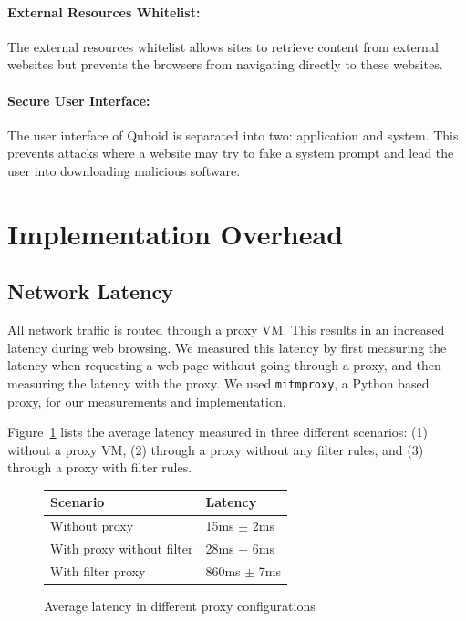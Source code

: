 \paragraph{External Resources Whitelist:} The external resources whitelist allows sites to retrieve content from external websites but prevents the browsers from navigating directly to these websites.

\paragraph{Secure User Interface:} The user interface of Quboid is separated into two: application and system. This prevents attacks where a website may try to fake a system prompt and lead the user into downloading malicious software.

\section{Implementation Overhead}

\subsection{Network Latency}

All network traffic is routed through a proxy VM. This results in an increased latency during web browsing. We measured this latency by first measuring the latency when requesting a web page without going through a proxy, and then measuring the latency with the proxy. We used \texttt{mitmproxy}, a Python based proxy, for our measurements and implementation.

Figure~\ref{fig:latency} lists the average latency measured in three different scenarios: (1) without a proxy VM, (2) through a proxy without any filter rules, and (3) through a proxy with filter rules.

\begin{figure}
\centering
    \begin{tabular}{| l | l |}
    \hline
    \textbf{Scenario} & \textbf{Latency} \\ \hline
    Without proxy & 15ms $\pm$ 2ms \\ \hline
    With proxy without filter & 28ms $\pm$ 6ms \\ \hline
    With filter proxy & 860ms $\pm$ 7ms \\ \hline
    \hline
    \end{tabular}
\caption{Average latency in different proxy configurations} \label{fig:latency}
\end{figure}

